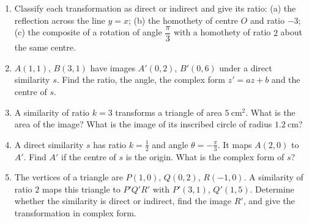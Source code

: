 \documentclass[11pt]{article}
\begin{document}
\begin{exercice}
\begin{enumerate}
\item Classify each transformation as direct or indirect and give its ratio: (a) the reflection across the line $y = x$; (b) the homothety of centre $O$ and ratio $-3$; (c) the composite of a rotation of angle $\dfrac{\pi}{3}$ with a homothety of ratio $2$ about the same centre.
\item $A(1, 1)$, $B(3, 1)$ have images $A'(0, 2)$, $B'(0, 6)$ under a direct similarity $s$. Find the ratio, the angle, the complex form $z' = az + b$ and the centre of $s$.
\item A similarity of ratio $k = 3$ transforms a triangle of area $5\ \mathrm{cm}^2$. What is the area of the image? What is the image of its inscribed circle of radius $1.2\ \mathrm{cm}$?
\item A direct similarity $s$ has ratio $k = \frac{1}{2}$ and angle $\theta = -\frac{\pi}{3}$. It maps $A(2, 0)$ to $A'$. Find $A'$ if the centre of $s$ is the origin. What is the complex form of $s$?
\item The vertices of a triangle are $P(1, 0)$, $Q(0, 2)$, $R(-1, 0)$. A similarity of ratio $2$ maps this triangle to $P'Q'R'$ with $P'(3, 1)$, $Q'(1, 5)$. Determine whether the similarity is direct or indirect, find the image $R'$, and give the transformation in complex form.
\end{enumerate}
\end{exercice}
\end{document}
